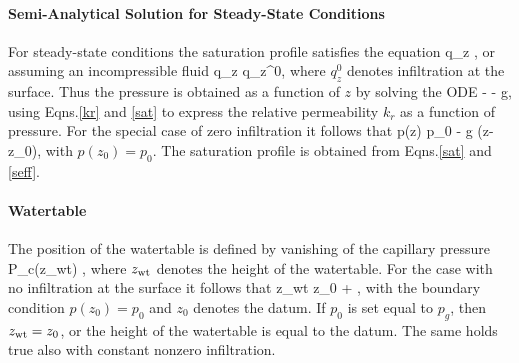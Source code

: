 \paragraph{Semi-Analytical Solution for Steady-State Conditions}

For steady-state conditions the saturation profile satisfies the equation
\EQ
{} \rho q_z ,
\EN
or assuming an incompressible fluid
\EQ
q_z \eq q_z^0,
\EN
where $q_z^0$ denotes infiltration at the surface. Thus the pressure is obtained as a function of $z$ by solving the ODE
\EQ\label{dpdz}
 \eq - - \rho g,
\EN
using Eqns.\eqref{kr} and \eqref{sat} to express the relative permeability $k_r$ as a function of pressure. For the special case of zero infiltration it follows that
\EQ
p(z) \eq p_0 - \rho g (z-z_0),
\EN
with $p(z_0)\!=\!p_0$. The saturation profile is obtained from Eqns.\eqref{sat} and \eqref{seff}.

\paragraph{Watertable}

The position of the watertable is defined by vanishing of the capillary pressure
\EQ
P_c(z_{\rm wt}) ,
\EN
where $z_{\rm wt}$ denotes the height of the watertable. For the case with no infiltration at the surface it follows that
\EQ
z_{\rm wt} \eq z_0 + ,
\EN
with the boundary condition $p(z_0) = p_0$ and $z_0$ denotes the datum. If $p_0$ is set equal to $p_g$, then $z_{\rm wt} = z_0$, or the height of the watertable is equal to the datum.
The same holds true also with constant nonzero infiltration. 

